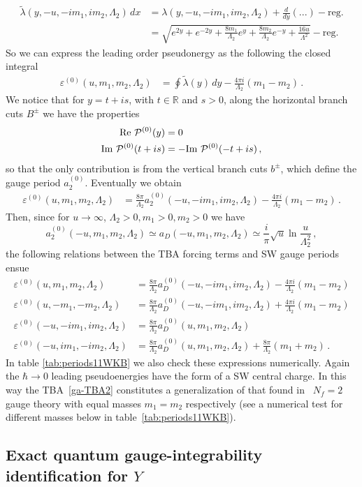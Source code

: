 \documentclass[11pt,a4paper]{elsarticle}
\def \ba {\begin{aligned}}
\def \ea {\end{aligned}}
\newcommand{\be}{\begin{equation}}
\newcommand{\ee}{\end{equation}}
\def\Re{{\rm Re ~}}
\def\Im{{\rm Im ~}}
\numberwithin{figure}{section}
\numberwithin{table}{section}
\begin{document}
\be 
\ba
\tilde\lambda(y,-u,-i m_1,i m_2,\Lambda_2) \, dx &= \lambda(y,-u,-i m_1,i m_2,\Lambda_2)+\frac{d}{dy}\left( ...\right)- \mathrm{reg.}\\
&=\sqrt{e^{2y}+e^{-2y}+ \frac{8m_1}{\Lambda_2} e^y+\frac{8m_2}{\Lambda_2}e^{-y} + \frac{16 u}{\Lambda^2}} - \mathrm{reg.} 
\ea
\ee 
So we can express the leading order pseudonergy as the following the closed integral
\be 
\ba 
\varepsilon^{(0)}(u,m_1,m_2,\Lambda_2) &= \oint \tilde\lambda(y)\, dy  - \frac{4 \pi i}{\Lambda_2}(m_1-m_2) \,.
\ea 
\ee 
We notice that for $y=t+i s$, with $t \in \mathbb R$ and $s>0$, along the horizontal branch cuts $B^\pm$ we have the properties
\be 
\ba 
\Re \mathcal{P}^{(0)}(y) &=0\\
\Im  \mathcal{P}^{(0)}(t+is)&=-\Im  \mathcal{P}^{(0)}(-t+is)\,,
\ea 
\ee 
so that the only contribution is from the vertical branch cuts $b^\pm$, which define the gauge period $a_2^{(0)}$. Eventually we obtain
\be 
\ba 
\varepsilon^{(0)}(u,m_1,m_2,\Lambda_2) 
&=\frac{8 \pi}{\Lambda_2}a_2^{(0)}(-u,-i m_1,i m_2,\Lambda_2) -\frac{4\pi i}{\Lambda_2} (m_1-m_2)\,.
\ea 
\ee 
Then, since for $u\to \infty$, $\Lambda_2>0,m_1>0,m_2 >0$ we have 
\be
a_2^{(0)}(-u,m_1,m_2,\Lambda_2)\simeq a_D(-u,m_1,m_2,\Lambda_2)\simeq \frac{i}{ \pi} \sqrt{ u} \ln \frac{u}{\Lambda_2^2}
\,,
\ee
the following relations between the TBA forcing terms and SW gauge periods ensue
\be \label{epsaDNf=2} 
\ba
\varepsilon^{(0)}(u,m_1,m_2,\Lambda_2) &=\frac{8  \pi}{\Lambda_2}a_D^{(0)}(-u,-i m_1,i m_2,\Lambda_2) -\frac{4\pi i}{\Lambda_2} (m_1-m_2) \\
\varepsilon^{(0)}(u,-m_1,-m_2,\Lambda_2) &=\frac{8 \pi}{\Lambda_2}a_D^{(0)}(-u,-i m_1,i m_2,\Lambda_2) +\frac{4\pi i}{\Lambda_2} (m_1-m_2)\\
\varepsilon^{(0)}(-u,-im_1,im_2,\Lambda_2) &=\frac{8 \pi}{\Lambda_2}a_D^{(0)}(u,m_1,m_2,\Lambda_2) \\
\varepsilon^{(0)}(-u,im_1,-im_2,\Lambda_2) &=\frac{8  \pi}{\Lambda_2}a_D^{(0)}(u,m_1,m_2,\Lambda_2)+\frac{8\pi}{\Lambda_2} (m_1+m_2) 
\,.
\ea
\ee
In table \ref{tab:periods11WKB} we also check these expressions numerically. Again the $\hbar \to 0$ leading pseudoenergies have the form of a SW central charge. In this way the TBA~\eqref{ga-TBA2} constitutes a generalization of that found in~\cite{Imaizumi:2021} $N_f=2$ gauge theory with equal masses $m_1 = m_2$ respectively (see a numerical test for different masses below in table~\ref{tab:periods11WKB}).  


\subsection{Exact quantum gauge-integrability identification for $Y$} \label{subsecYex}
\end{document}
